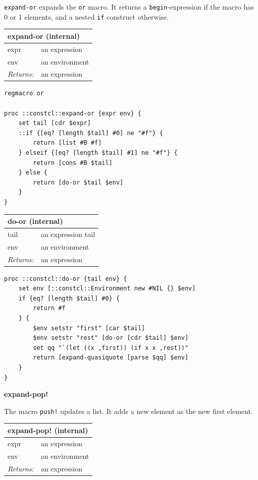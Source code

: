 \documentclass[twoside,9pt]{report}
\begin{document}
\texttt{expand-or} expands the \texttt{or} macro. It returns a \texttt{begin}-expression if the macro has 0 or 1 elements, and a nested \texttt{if} construct otherwise.

\begin{tabular}{ |l l| }
\hline
\multicolumn{2}{|l|}{expand-or (internal)} \\
\hline
expr & an expression \\
env & an environment \\
\textit{Returns:} & an expression \\
\hline
\end{tabular}

\noindent\makebox[\linewidth]{\rule{\linewidth}{0.4pt}}
\begin{lstlisting}
regmacro or
 
proc ::constcl::expand-or {expr env} {
    set tail [cdr $expr]
    ::if {[eq? [length $tail] #0] ne "#f"} {
        return [list #B #f]
    } elseif {[eq? [length $tail] #1] ne "#f"} {
        return [cons #B $tail]
    } else {
        return [do-or $tail $env]
    }
}
\end{lstlisting}
\noindent\makebox[\linewidth]{\rule{\linewidth}{0.4pt}}
\begin{tabular}{ |l l| }
\hline
\multicolumn{2}{|l|}{do-or (internal)} \\
\hline
tail & an expression tail \\
env & an environment \\
\textit{Returns:} & an expression \\
\hline
\end{tabular}

\noindent\makebox[\linewidth]{\rule{\linewidth}{0.4pt}}
\begin{lstlisting}
proc ::constcl::do-or {tail env} {
    set env [::constcl::Environment new #NIL {} $env]
    if {eq? [length $tail] #0} {
        return #f
    } {
        $env setstr "first" [car $tail]
        $env setstr "rest" [do-or [cdr $tail] $env]
        set qq "`(let ((x ,first)) (if x x ,rest))"
        return [expand-quasiquote [parse $qq] $env]
    }
}
\end{lstlisting}
\noindent\makebox[\linewidth]{\rule{\linewidth}{0.4pt}}

\textbf{expand-pop!}


The macro \texttt{push!} updates a list. It adds a new element as the new first element.

\begin{tabular}{ |l l| }
\hline
\multicolumn{2}{|l|}{expand-pop! (internal)} \\
\hline
expr & an expression \\
env & an environment \\
\textit{Returns:} & an expression \\
\hline
\end{tabular}
\end{document}
